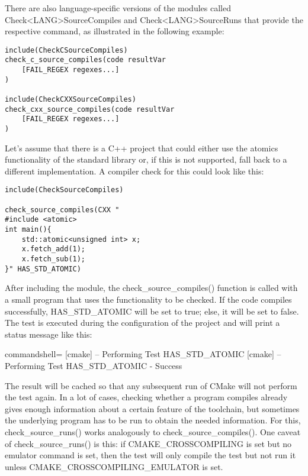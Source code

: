 There are also language-specific versions of the modules called Check<LANG>SourceCompiles and Check<LANG>SourceRuns that provide the respective command, as illustrated in the following example:

\begin{lstlisting}[style=styleCMake]
include(CheckCSourceCompiles)
check_c_source_compiles(code resultVar
	[FAIL_REGEX regexes...]
)

include(CheckCXXSourceCompiles)
check_cxx_source_compiles(code resultVar
	[FAIL_REGEX regexes...]
)
\end{lstlisting}

Let's assume that there is a C++ project that could either use the atomics functionality of the standard library or, if this is not supported, fall back to a different implementation. A compiler check for this could look like this:

\begin{lstlisting}[style=styleCMake]
include(CheckSourceCompiles)

check_source_compiles(CXX "
#include <atomic>
int main(){
	std::atomic<unsigned int> x;
	x.fetch_add(1);
	x.fetch_sub(1);
}" HAS_STD_ATOMIC)
\end{lstlisting}

After including the module, the check\_source\_compiles() function is called with a small program that uses the functionality to be checked. If the code compiles successfully, HAS\_STD\_ATOMIC will be set to true; else, it will be set to false. The test is executed during the configuration of the project and will print a status message like this:

\begin{tcblisting}{commandshell={}}
[cmake] -- Performing Test HAS_STD_ATOMIC
[cmake] -- Performing Test HAS_STD_ATOMIC - Success
\end{tcblisting}

The result will be cached so that any subsequent run of CMake will not perform the test again. In a lot of cases, checking whether a program compiles already gives enough information about a certain feature of the toolchain, but sometimes the underlying program has to be run to obtain the needed information. For this, check\_source\_runs() works analogously to check\_source\_compiles(). One caveat of check\_source\_runs() is this: if CMAKE\_CROSSCOMPILING is set but no emulator command is set, then the test will only compile the test but not run it unless CMAKE\_CROSSCOMPILING\_EMULATOR is set.

